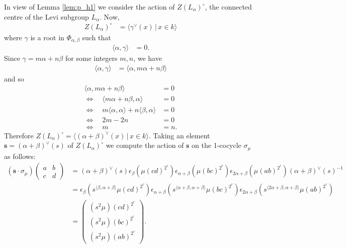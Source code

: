 	In view of Lemma \ref{lem:p_h1} we consider the action of $Z(L_\alpha)^\circ$, the connected centre of the Levi subgroup $L_\alpha$. Now, 
	\begin{align*}
	Z(L_\alpha)^\circ &= \langle \gamma^\vee(x)\,|\,x \in k \rangle
	\end{align*}
	where $\gamma$ is a root in $\Phi_{\alpha, \beta}$ such that
	\begin{align}
	\langle \alpha, \gamma \rangle &= 0.
	\end{align}
	Since $\gamma = m\alpha + n\beta$ for some integers $m,n$, we have
	\begin{align}
	\langle \alpha, \gamma \rangle &= \langle \alpha, m\alpha + n\beta \rangle
	\end{align}
	and so
	\begin{align*}
	\langle \alpha, m\alpha + n\beta \rangle &= 0 \\
																							\Longleftrightarrow \quad  \langle m\alpha + n\beta, \alpha \rangle &= 0 \\
																							\Longleftrightarrow \quad  m\langle \alpha, \alpha \rangle + n \langle \beta, \alpha\rangle &= 0 \\
																							\Longleftrightarrow \quad  2m - 2n &= 0 \\
																							\Longleftrightarrow \quad  m &= n.
																							\end{align*}
																							Therefore $Z(L_ \alpha)^\circ = \langle (\alpha + \beta)^\vee(x)\,|\,x \in k \rangle$. Taking an element $\mathbf{s} = (\alpha + \beta)^\vee(s)$ of $Z(L_\alpha)^\circ$ we compute the action of $\mathbf{s}$ on the 1-cocycle $\sigma_\mu$ as follows:
																							\begin{align*}
\left(\mathbf{s}\cdot \sigma_\mu\right)
\left(\begin{matrix} a & b \\ c & d\end{matrix} \right) 
	&=
	(\alpha + \beta)^\vee(s) \epsilon_\beta \left(\mu (cd)^{2^r} \right)\epsilon_{\alpha+\beta} \left(\mu(bc)^{2^r} \right)\epsilon_{2\alpha + \beta} \left(\mu(ab)^{2^r} \right)(\alpha + \beta)^\vee(s)^{-1}\\
		&=  \epsilon_\beta\left(s^{\langle\beta , \alpha+\beta\rangle}\mu (cd)^{2^r} \right)\epsilon_{\alpha+\beta} \left(s^{\langle \alpha+\beta, \alpha+\beta \rangle} \mu(bc)^{2^r} \right)\epsilon_{2\alpha + \beta} \left(s^{\langle 2\alpha+\beta, \alpha+\beta\rangle}\mu(ab)^{2^r}\right) \\
		&=
		\left(\begin{matrix}
				(s^2\mu)(cd)^{2^r} \\
				(s^2\mu)(bc)^{2^r} \\
				(s^2\mu)(ab)^{2^r}
				\end{matrix}\right).
		\end{align*}


